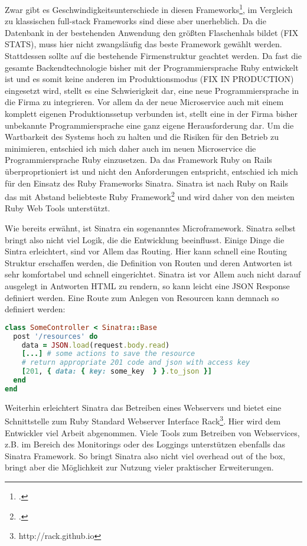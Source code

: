 Zwar gibt es Geschwindigkeitsunterschiede in diesen Frameworks\footcite[vgl.][]{frameworks}, im Vergleich zu klassischen full-stack Frameworks sind diese aber unerheblich. Da die Datenbank in der bestehenden Anwendung den größten Flaschenhals bildet (FIX STATS), muss hier nicht zwangsläufig das beste Framework gewählt werden. Stattdessen sollte auf die bestehende Firmenstruktur geachtet werden. Da fast die gesamte Backendtechnologie bisher mit der Programmiersprache Ruby entwickelt ist und es somit keine anderen im Produktionsmodus (FIX IN PRODUCTION) eingesetzt wird, stellt es eine Schwierigkeit dar, eine neue Programmiersprache in die Firma zu integrieren. Vor allem da der neue Microservice auch mit einem komplett eigenen Produktionssetup verbunden ist, stellt eine in der Firma bisher unbekannte Programmiersprache eine ganz eigene Herausforderung dar. Um die Wartbarkeit des Systems hoch zu halten und die Risiken für den Betrieb zu minimieren, entschied ich mich daher auch im neuen Microservice die Programmiersprache Ruby einzusetzen. Da das Framework Ruby on Rails überproprtioniert ist und nicht den Anforderungen entspricht, entschied ich mich für den Einsatz des Ruby Frameworks Sinatra. 
Sinatra ist nach Ruby on Rails das mit Abstand beliebteste Ruby Framework\footcite[vgl.][]{ruby2015} und wird daher von den meisten Ruby Web Tools unterstützt.

Wie bereits erwähnt, ist Sinatra ein sogenanntes Microframework. Sinatra selbst bringt also nicht viel Logik, die die Entwicklung beeinflusst. Einige Dinge die Sintra erleichtert, sind vor Allem das Routing. Hier kann schnell eine Routing Struktur erschaffen werden, die Definition von Routen und deren Antworten ist sehr komfortabel und schnell eingerichtet. Sinatra ist vor Allem auch nicht darauf ausgelegt in Antworten HTML zu rendern, so kann leicht eine JSON Response definiert werden.
Eine Route zum Anlegen von Resourcen kann demnach so definiert werden:
\begin{lstlisting}[language=Ruby]
class SomeController < Sinatra::Base
  post '/resources' do
    data = JSON.load(request.body.read)
    [...] # some actions to save the resource
    # return appropriate 201 code and json with access key
    [201, { data: { key: some_key  } }.to_json }]
  end
end
\end{lstlisting}

Weiterhin erleichtert Sinatra das Betreiben eines Webservers und bietet eine Schnittstelle zum Ruby Standard Webserver Interface Rack\footnote{http://rack.github.io}. Hier wird dem Entwickler viel Arbeit abgenommen. Viele Tools zum Betreiben von Webservices, z.B. im Bereich des Monitorings oder des Loggings unterstützen ebenfalls das Sinatra Framework. So bringt Sinatra also nicht viel overhead out of the box, bringt aber die Möglichkeit zur Nutzung vieler praktischer Erweiterungen.

